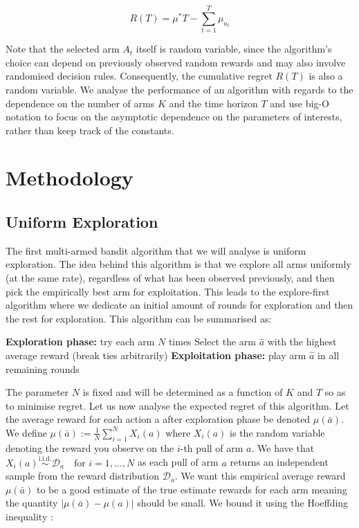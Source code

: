 \documentclass[12pt]{article}
\begin{document}
\begin{equation}
R(T) = \mu^* T - \sum_{t=1}^{T} \mu_{a_t}
\tag{2.1}
\label{eq:regret-formula}
\end{equation}


Note that the selected arm \(A_t\) itself is random variable, since the algorithm’s choice can depend on previously observed random rewards and may also involve randomised decision rules. Consequently, the cumulative regret $R(T)$ is also a random variable. We analyse the performance of an algorithm with regards to the dependence on the number of arms $K$ and the time horizon $T$ and use big-O notation to focus on the asymptotic dependence on the parameters of interests, rather than keep track of the constants.

\section{Methodology}

\subsection{Uniform Exploration}

The first multi-armed bandit algorithm that we will analyse is uniform exploration. The idea behind this algorithm is that we explore all arms uniformly (at the same rate), regardless of what has been observed previously, and then pick the empirically best arm for exploitation. This leads to the explore-first algorithm where we dedicate an initial amount of rounds for exploration and then the rest for exploration. This algorithm can be summarised as: 

\begin{algorithm}
\caption{Explore-First with parameter $N$}
\begin{algorithmic}[1]

\STATE \textbf{Exploration phase:} try each arm $N$ times
\STATE Select the arm $\hat{a}$ with the highest average reward (break ties arbitrarily)
\STATE \textbf{Exploitation phase:} play arm $\hat{a}$ in all remaining rounds

\end{algorithmic}
\end{algorithm}

The parameter $N$ is fixed and will be determined as a function of $K$ and $T$ so as to minimise regret. Let us now analyse the expected regret of this algorithm. Let the average reward for each action a after exploration phase be denoted $\mu(\bar{a})$. We define $\mu(\bar{a}) := \frac{1}{N} \sum_{i = 1}^{N} X_i (a)$ where $X_i (a)$ is the random variable denoting the reward you observe on the $i$-th pull of arm $a$. We have that $X_i(a) \overset{\text{i.i.d.}}{\sim} \mathcal{D}_a \quad \text{for } i = 1, \dots, N$ as each pull of arm $a$ returns an independent sample from the reward distribution $\mathcal{D}_a$. We want this empirical average reward $\mu(\bar{a})$ to be a good estimate of the true estimate rewards for each arm meaning the quantity $| \mu(\bar{a}) - \mu(a) |$ should be small. We bound it using the Hoeffding inequality \cite{Dubhashi_Panconesi_2009}:
\end{document}
